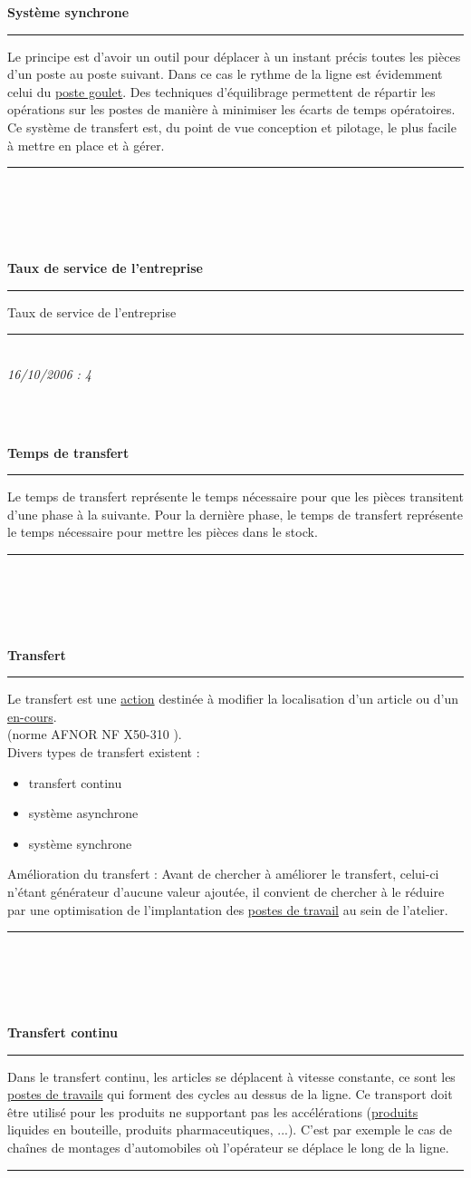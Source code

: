 \documentclass[12pt,a4paper,twoside]{article}
\newcommand{\definition}[3]{
	\begin{minipage}{\textwidth}
		\textbf{\large{#1}}\\
		\rule{\textwidth}{0.5pt}
		#2\\
		\ifthenelse{\isempty{#3}}%
	    {}%
	    {\rule{\textwidth}{0.25pt}\\\textit{#3}}%
    \end{minipage}
    \\\\
}
\begin{document}
\definition{Système synchrone}
{
	Le principe est d'avoir un outil pour déplacer à un instant précis toutes les pièces d'un poste au poste suivant. Dans ce cas le rythme de la ligne est évidemment celui du \href{http://gpr.insa-lyon.fr/supgedem/Home/glossaire/glespostegoulet.htm}{poste goulet}. Des techniques d'équilibrage permettent de répartir les opérations sur les postes de manière à minimiser les écarts de temps opératoires.
Ce système de transfert est, du point de vue conception et pilotage, le plus facile à mettre en place et à gérer.
	}{}
	
\definition{Taux de service de l'entreprise}
{
	Taux de service de l'entreprise
	}{16/10/2006 : 4}
	
\definition{Temps de transfert}
{
	Le temps de transfert représente le temps nécessaire pour que les pièces transitent d'une phase à la suivante. Pour la dernière phase, le temps de transfert représente le temps nécessaire pour mettre les pièces dans le stock.
	}{}
	
\definition{Transfert}
{
	Le transfert est une \href{http://gpr.insa-lyon.fr/supgedem/Home/Le_monde_industriel/L_entreprise/Le_systeme_physique_de_production/actions.htm}{action} destinée à modifier la localisation d'un article ou d'un \href{http://gpr.insa-lyon.fr/supgedem/Home/Le_monde_industriel/L_entreprise/Le_systeme_physique_de_production/lencours.htm}{en-cours}.\\
	(norme AFNOR NF X50-310 ).\\
	Divers types de transfert existent :
	\begin{itemize}
	\item transfert continu
	\item système asynchrone
	\item système synchrone
	\end{itemize}
	Amélioration du transfert : Avant de chercher à améliorer le transfert, celui-ci n'étant générateur d'aucune valeur ajoutée, il convient de chercher à le réduire par une optimisation de l'implantation des \href{http://gpr.insa-lyon.fr/supgedem/Home/Le_monde_industriel/L_entreprise/Le_systeme_physique_de_production/lepostedetrav.htm}{postes de travail} au sein de l'atelier.
	}{}
	
\definition{Transfert continu}
{
	Dans le transfert continu, les articles se déplacent à vitesse constante, ce sont les \href{http://gpr.insa-lyon.fr/supgedem/Home/Le_monde_industriel/L_entreprise/Le_systeme_physique_de_production/lepostedetrav.htm}{postes de travails} qui forment des cycles au dessus de la ligne. Ce transport doit être utilisé pour les produits ne supportant pas les accélérations (\href{http://gpr.insa-lyon.fr/supgedem/Home/glossaire/gLeproduit.htm}{produits} liquides en bouteille, produits pharmaceutiques, ...). C'est par exemple le cas de chaînes de montages d'automobiles où l'opérateur se déplace le long de la ligne.
	}{}
	
\end{document}
